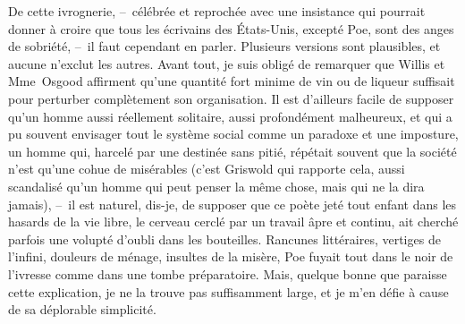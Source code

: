 \documentclass[french,twoside]{book} %
\begin{document}
De cette ivrognerie, – célébrée et reprochée avec une insistance qui pourrait donner à croire que tous les écrivains des États-Unis, excepté Poe, sont des anges de sobriété, – il faut cependant en parler. Plusieurs versions sont plausibles, et aucune n’exclut les autres. Avant tout, je suis obligé de remarquer que Willis et Mme Osgood affirment qu’une quantité fort minime de vin ou de liqueur suffisait pour perturber complètement son organisation. Il est d’ailleurs facile de supposer qu’un homme aussi réellement solitaire, aussi profondément malheureux, et qui a pu souvent envisager tout le système social comme un paradoxe et une imposture, un homme qui, harcelé par une destinée sans pitié, répétait souvent que la société n’est qu’une cohue de misérables (c’est Griswold qui rapporte cela, aussi scandalisé qu’un homme qui peut penser la même chose, mais qui ne la dira jamais), – il est naturel, dis-je, de supposer que ce poète jeté tout enfant dans les hasards de la vie libre, le cerveau cerclé par un travail âpre et continu, ait cherché parfois une volupté d’oubli dans les bouteilles. Rancunes littéraires, vertiges de l’infini, douleurs de ménage, insultes de la misère, Poe fuyait tout dans le noir de l’ivresse comme dans une tombe préparatoire. Mais, quelque bonne que paraisse cette explication, je ne la trouve pas suffisamment large, et je m’en défie à cause de sa déplorable simplicité.
\end{document}
